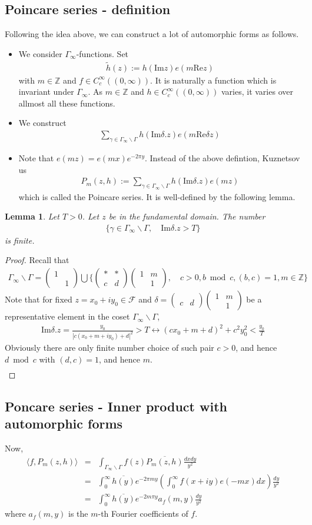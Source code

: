 \documentclass[11pt,reqno]{amsart}
\newcommand{\bea}{\begin{eqnarray}}
\newcommand{\eea}{\end{eqnarray}}
\newcommand{\bna}{\begin{eqnarray*}}
\newcommand{\ena}{\end{eqnarray*}}
\newcommand{\bma}{\begin{pmatrix}}
\newcommand{\ema}{\end{pmatrix}}
\def\re{{\mathrm{Re}}}
\def\im{{\mathrm{Im}}}
\def\Z{\mathbb{Z}}
\newtheorem{lemma}{Lemma}[section]
\theoremstyle{definition}
\newcommand{\bit}{\begin{itemize}}
\newcommand{\eit}{\end{itemize}}
\begin{document}
\subsection{Poincare series - definition}
Following the idea above, we can construct a lot of automorphic forms as follows.
\bit
\item We consider $\Gamma_\infty$-functions. Set
\bna
\tilde h(z):=h(\im z)e(m\re z)
\ena
with $m\in \Z$ and $f\in C_c^\infty((0,\infty))$. It is naturally a function which
is invariant under $\Gamma_\infty$.
As $m\in\Z$ and $h\in C_c^\infty((0,\infty))$ varies, it varies over allmost all
these functions.
\item We construct
\bna
\sum_{\gamma\in\Gamma_\infty\backslash \Gamma} h(\im \delta. z)e(m\re \delta z)
\ena
\item Note that $e(mz)=e(mx)e^{-2\pi y}$.
Instead of the above defintion, Kuznetsov us
\bna
P_m(z,h):=\sum_{\gamma\in\Gamma_\infty\backslash \Gamma} h(\im \delta. z)e(m z)
\ena
which is called the Poincare series. It is well-defined by the following lemma.
\eit

\begin{lemma}Let $T>0$. Let $z$ be in the fundamental domain.
The number
\bna
\{\gamma\in\Gamma_\infty\backslash\Gamma,\quad \im\delta.z>T\}
\ena
is finite.
\end{lemma}
\begin{proof}
Recall that
\bna
\Gamma_\infty\backslash\Gamma=
\bma 1\\&1\ema\bigcup \{\bma *&*\\ c&d\ema\bma 1&m\\&1\ema,\quad c>0,b\bmod c,(b,c)=1,m\in\Z\}
\ena
Note that for fixed $z=x_0+iy_0\in\mathcal F$ and  $\delta=\bma &\\ c&d\ema\bma 1&m\\&1\ema$ be a representative element in the coset $\Gamma_\infty\backslash\Gamma$,
 \bna
 \im \delta. z=\frac{y_0}{|c(x_0+m+iy_0)+d|^2}>T
 \leftrightarrow (cx_0+m+d)^2+ c^2y_0^2<\frac{y_0}{T}
 \ena
 Obviously there are only finite number choice of such pair $c>0$,
  and hence $d\bmod c$ with $(d,c)=1$, and hence $m$.
\bna
\ena
\end{proof}

\subsection{Poncare series - Inner product with automorphic forms}
Now,
\bea
\nonumber\langle f,P_m(z,h)\rangle
&=&\int_{\Gamma_\infty\backslash\Gamma}f(z)\overline{P_m(z,h)}\frac{dxdy}{y^2}\\
\nonumber&=&\int_0^\infty \overline{h(y)}e^{-2\pi my} \left(\int_0^\infty f(x+iy)e(-mx)dx\right)\frac{dy}{y^2}\\
&=&\int_0^\infty \overline{h(y)} e^{-2m\pi y} a_f(m,y)\frac{dy}{y^2}
\label{inner-product-with-Poincare-series}
\eea
where $a_f(m,y)$ is the $m$-th Fourier coefficients of $f$.
\end{document}
